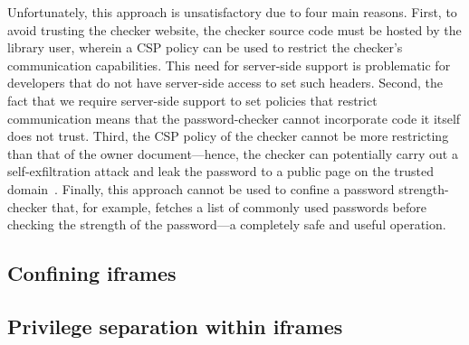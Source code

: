 Unfortunately, this approach is unsatisfactory due to four main reasons.
%
First, to avoid trusting the checker website, the checker source code
must be hosted by the library user, wherein a CSP policy can be used
to restrict the checker's communication capabilities. 
%
This need for server-side support is problematic for developers that
do not have server-side access to set such headers.
%
Second, the fact that we require server-side support to set policies
that restrict communication means that the password-checker cannot
incorporate code it itself does not trust.
%
Third, the CSP policy of the checker cannot be more restricting than
that of the owner document---hence, the checker can potentially carry
out a self-exfiltration attack and leak the password to a public page
on the trusted domain~.
%
Finally, this approach cannot be used to confine a password
strength-checker that, for example, fetches a list of commonly used
passwords before checking the strength of the password---a completely
safe and useful operation.



\subsection{Confining iframes}
\label{sec:system:iframe}

\subsection{Privilege separation within iframes}
\label{sec:system:script}
